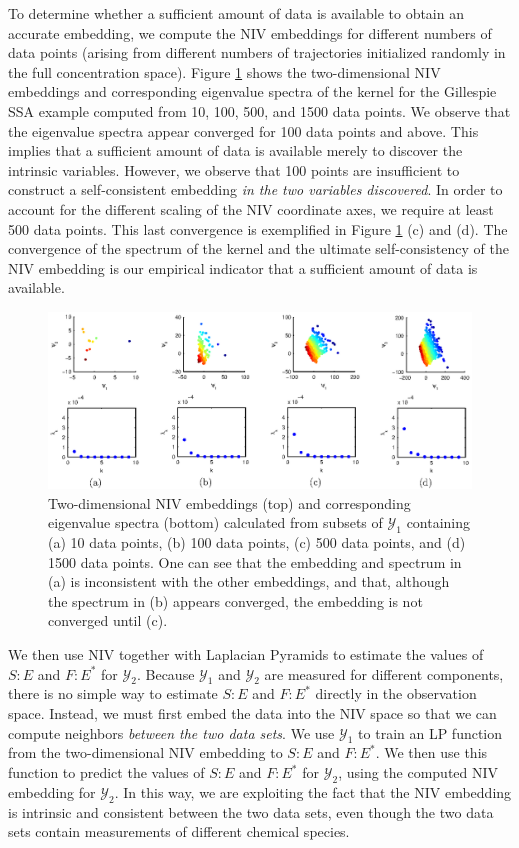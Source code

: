 To determine whether a sufficient amount of data is available to obtain an accurate embedding, we compute the NIV embeddings for different numbers of data points
(arising from different numbers of trajectories initialized randomly in the full concentration space).
%
Figure \ref{fig:rxn_convergence} shows the two-dimensional NIV embeddings and corresponding eigenvalue spectra of the kernel for the Gillespie SSA example computed from 10, 100, 500, and 1500 data points.
%
We observe that the eigenvalue spectra appear converged for 100 data points and above.
%
This implies that a sufficient amount of data is available merely to discover the intrinsic variables.
%
However, we observe that 100 points are insufficient to construct a self-consistent embedding {\em in the two variables discovered}.
%
In order to account for the different scaling of the NIV coordinate axes, we require at least 500 data points.
%
This last convergence is exemplified in Figure \ref{fig:rxn_convergence} (c) and (d).
%
The convergence of the spectrum of the kernel and the ultimate self-consistency of the NIV embedding is our empirical indicator that a sufficient amount of data is available.
\begin{figure}[t]
    \includegraphics[width=6in]{fig4b}
    \caption[Convergence of intrinsic variable embeddings as a function of the number of data points]{Two-dimensional NIV embeddings (top) and corresponding eigenvalue spectra (bottom) calculated from subsets of $\mathcal{Y}_1$ containing (a) 10 data points, (b) 100 data points, (c) 500 data points, and (d) 1500 data points. One can see that the embedding and spectrum in (a) is inconsistent with the other embeddings, and that, although the spectrum in (b) appears converged, the embedding is not converged until (c). }
    \label{fig:rxn_convergence}
\end{figure}

We then use NIV together with Laplacian Pyramids to estimate the values of $S:E$ and $F:E^{*}$ for $\mathcal{Y}_2$.
%
Because $\mathcal{Y}_1$ and $\mathcal{Y}_2$ are measured for different components, there is no simple way to estimate $S:E$ and $F:E^{*}$ directly in the observation space.
%
Instead, we must first embed the data into the NIV space so that we can compute neighbors {\em between the two data sets}.
%
We use $\mathcal{Y}_1$ to train an LP function from the two-dimensional NIV embedding to $S:E$ and $F:E^{*}$.
%
We then use this function to predict the values  of $S:E$ and $F:E^{*}$ for $\mathcal{Y}_2$, using the computed NIV embedding for $\mathcal{Y}_2$.
%
In this way, we are exploiting the fact that the NIV embedding is intrinsic and consistent between the two data sets, even though the two data sets contain measurements of different chemical species.

